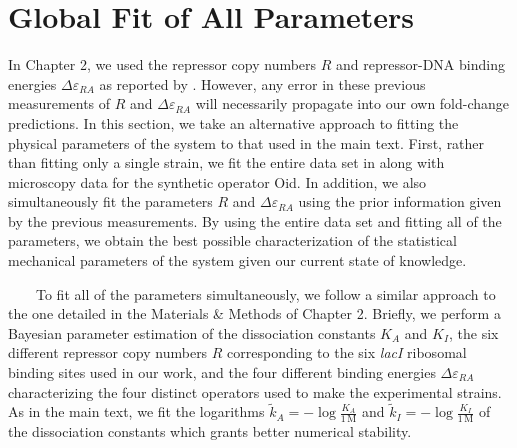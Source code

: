 \documentclass[12pt]{caltech_thesis}
\begin{document}
\hypertarget{global-fit-of-all-parameters}{%
\section{Global Fit of All
Parameters}\label{global-fit-of-all-parameters}}

In Chapter 2, we used the repressor copy numbers \(R\) and repressor-DNA
binding energies \(\Delta\varepsilon_{RA}\) as reported by
\textcite{garcia2011}. However, any error in these previous measurements
of \(R\) and \(\Delta\varepsilon_{RA}\) will necessarily propagate into
our own fold-change predictions. In this section, we take an alternative
approach to fitting the physical parameters of the system to that used
in the main text. First, rather than fitting only a single strain, we
fit the entire data set in along with microscopy data for the synthetic
operator Oid. In addition, we also simultaneously fit the parameters
\(R\) and \(\Delta\varepsilon_{RA}\) using the prior information given
by the previous measurements. By using the entire data set and fitting
all of the parameters, we obtain the best possible characterization of
the statistical mechanical parameters of the system given our current
state of knowledge.

~~~~To fit all of the parameters simultaneously, we follow a similar
approach to the one detailed in the Materials \& Methods of Chapter 2.
Briefly, we perform a Bayesian parameter estimation of the dissociation
constants \(K_A\) and \(K_I\), the six different repressor copy numbers
\(R\) corresponding to the six \emph{lacI} ribosomal binding sites used
in our work, and the four different binding energies
\(\Delta \varepsilon_{RA}\) characterizing the four distinct operators
used to make the experimental strains. As in the main text, we fit the
logarithms \(\tilde{k}_A = -\log \frac{K_A}{1\,\text{M}}\) and
\(\tilde{k}_I = -\log \frac{K_I}{1\,\text{M}}\) of the dissociation
constants which grants better numerical stability.
\end{document}
